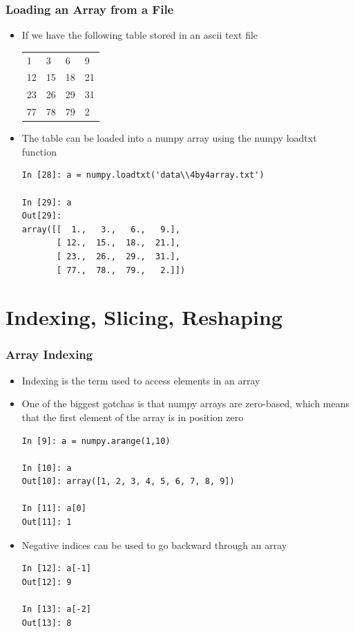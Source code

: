 \documentclass{beamer}
\begin{document}
\begin{frame}[fragile]
\frametitle{Loading an Array from a File}
\begin{itemize}
\item{If we have the following table stored in an ascii text file}
\begin{tabular}{l l l l}
  1 & 3 & 6 & 9 \\
  12 & 15 & 18 & 21 \\
  23 & 26 & 29 & 31 \\
  77 & 78 & 79 & 2 \\
\end{tabular}
\item{The table can be loaded into a numpy array using the numpy loadtxt function}
\begin{lstlisting}
In [28]: a = numpy.loadtxt('data\\4by4array.txt')

In [29]: a
Out[29]:
array([[  1.,   3.,   6.,   9.],
       [ 12.,  15.,  18.,  21.],
       [ 23.,  26.,  29.,  31.],
       [ 77.,  78.,  79.,   2.]])
\end{lstlisting}
\end{itemize}
\end{frame}

\section{Indexing, Slicing, Reshaping}
\begin{frame}[fragile]
\frametitle{Array Indexing}
  \begin{itemize}
    \item{Indexing is the term used to access elements in an array}
    \item{One of the biggest gotchas is that numpy arrays are zero-based, which means that the first element of the array is in position zero}
    \begin{lstlisting}
In [9]: a = numpy.arange(1,10)

In [10]: a
Out[10]: array([1, 2, 3, 4, 5, 6, 7, 8, 9])

In [11]: a[0]
Out[11]: 1
    \end{lstlisting}
    \item{Negative indices can be used to go backward through an array}
    \begin{lstlisting}
In [12]: a[-1]
Out[12]: 9

In [13]: a[-2]
Out[13]: 8
    \end{lstlisting}
  \end{itemize}
\end{frame}
\end{document}
